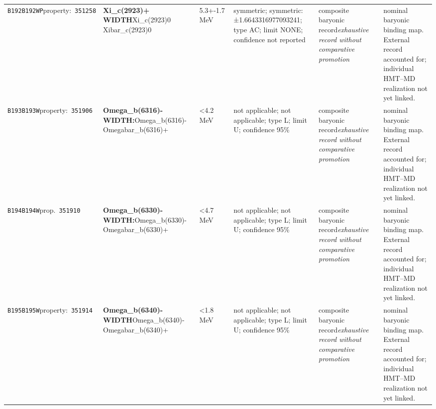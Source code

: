 \begin{landscape}
\begin{longtable}{L{1.85cm}L{4.45cm}L{2.35cm}L{4.05cm}L{3.35cm}L{7.15cm}}
\texttt{B192}\newline \texttt{B192WP}\newline property:\ \texttt{351258} & \textbf{Xi\_\allowbreak{}c(2923)+ WIDTH}\newline Xi\_\allowbreak{}c(2923)0 \textbar{}\allowbreak{} Xibar\_\allowbreak{}c(2923)0 & 5.3+-1.7\,MeV & symmetric; symmetric: ±1.6643316977093241; type AC; limit NONE; confidence not reported & composite baryonic record\newline \emph{exhaustive record without comparative promotion} & nominal baryonic binding map. External record accounted for; individual HMT--MD realization not yet linked. \\
\texttt{B193}\newline \texttt{B193W}\newline property:\ \texttt{351906} & \textbf{Omega\_\allowbreak{}b(6316)- WIDTH:}\newline Omega\_\allowbreak{}b(6316)- \textbar{}\allowbreak{} Omegabar\_\allowbreak{}b(6316)+ & \textless{}4.2\,MeV & not applicable; not applicable; type L; limit U; confidence 95\% & composite baryonic record\newline \emph{exhaustive record without comparative promotion} & nominal baryonic binding map. External record accounted for; individual HMT--MD realization not yet linked. \\
\texttt{B194}\newline \texttt{B194W}\newline prop.\ \texttt{351910} & \textbf{Omega\_\allowbreak{}b(6330)- WIDTH:}\newline Omega\_\allowbreak{}b(6330)- \textbar{}\allowbreak{} Omegabar\_\allowbreak{}b(6330)+ & \textless{}4.7\,MeV & not applicable; not applicable; type L; limit U; confidence 95\% & composite baryonic record\newline \emph{exhaustive record without comparative promotion} & nominal baryonic binding map. External record accounted for; individual HMT--MD realization not yet linked. \\
\texttt{B195}\newline \texttt{B195W}\newline property:\ \texttt{351914} & \textbf{Omega\_\allowbreak{}b(6340)- WIDTH}\newline Omega\_\allowbreak{}b(6340)- \textbar{}\allowbreak{} Omegabar\_\allowbreak{}b(6340)+ & \textless{}1.8\,MeV & not applicable; not applicable; type L; limit U; confidence 95\% & composite baryonic record\newline \emph{exhaustive record without comparative promotion} & nominal baryonic binding map. External record accounted for; individual HMT--MD realization not yet linked. \\

\end{longtable}
\end{landscape}
